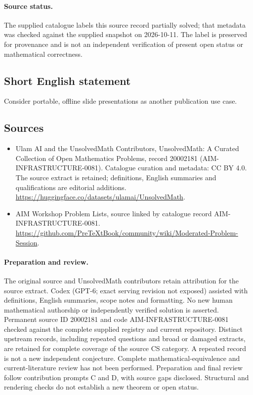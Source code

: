 \documentclass[11pt]{article}
\begin{document}
\paragraph{Source status.}
The supplied catalogue labels this source record partially solved; that metadata was checked against the supplied snapshot on 2026-10-11. The label is preserved for provenance and is not an independent verification of present open status or mathematical correctness.
\subsection{Short English statement}
Consider portable, offline slide presentations as another publication use case.
\subsection{Sources}
\begin{itemize}
\item[\hypertarget{source:20002181:1}{S1}] Ulam AI and the UnsolvedMath Contributors, UnsolvedMath: A Curated Collection of Open Mathematics Problems, record 20002181 (AIM-INFRASTRUCTURE-0081). Catalogue curation and metadata: CC BY 4.0. The source extract is retained; definitions, English summaries and qualifications are editorial additions.
\url{https://huggingface.co/datasets/ulamai/UnsolvedMath}.
\item[\hypertarget{source:20002181:2}{S2}] AIM Workshop Problem Lists, source linked by catalogue record AIM-INFRASTRUCTURE-0081.
\url{https://github.com/PreTeXtBook/community/wiki/Moderated-Problem-Session}.
\end{itemize}
\paragraph{Preparation and review.}
The original source and UnsolvedMath contributors retain attribution for the source extract. Codex (GPT-6; exact serving revision not exposed) assisted with definitions, English summaries, scope notes and formatting. No new human mathematical authorship or independently verified solution is asserted. Permanent source ID 20002181 and code AIM-INFRASTRUCTURE-0081 checked against the complete supplied registry and current repository. Distinct upstream records, including repeated questions and broad or damaged extracts, are retained for complete coverage of the source CS category. A repeated record is not a new independent conjecture. Complete mathematical-equivalence and current-literature review has not been performed. Preparation and final review follow contribution prompts C and D, with source gaps disclosed. Structural and rendering checks do not establish a new theorem or open status.
\label{end:20002181}
\end{document}
